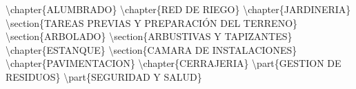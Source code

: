 \documentclass{book}%
\begin{document}
%
\textbackslash{}chapter\{ALUMBRADO\}\newline%
%
\textbackslash{}chapter\{RED DE RIEGO\}\newline%
%
\textbackslash{}chapter\{JARDINERIA\}\newline%
%
\textbackslash{}section\{TAREAS PREVIAS Y PREPARACIÓN  DEL TERRENO\}\newline%
%
\textbackslash{}section\{ARBOLADO\}\newline%
%
\textbackslash{}section\{ARBUSTIVAS Y TAPIZANTES\}\newline%
%
\textbackslash{}chapter\{ESTANQUE\}\newline%
%
\textbackslash{}section\{CAMARA DE INSTALACIONES\}\newline%
%
\textbackslash{}chapter\{PAVIMENTACION\}\newline%
%
\textbackslash{}chapter\{CERRAJERIA\}\newline%
%
\textbackslash{}part\{GESTION DE RESIDUOS\}\newline%
%
\textbackslash{}part\{SEGURIDAD Y SALUD\}\newline%

%
\end{document}
